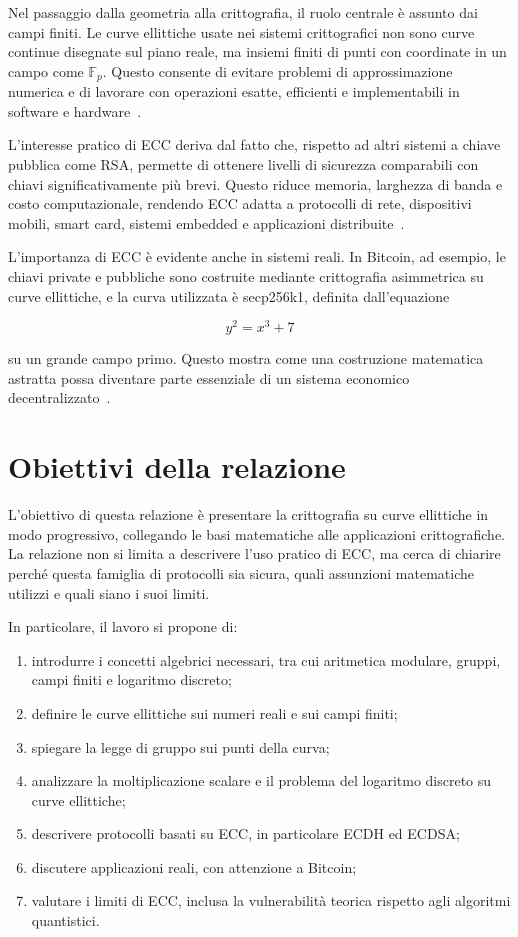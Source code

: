 \documentclass[12pt,a4paper,oneside]{report}
\begin{document}
Nel passaggio dalla geometria alla crittografia, il ruolo centrale è assunto dai campi finiti. Le curve ellittiche usate nei sistemi crittografici non sono curve continue disegnate sul piano reale, ma insiemi finiti di punti con coordinate in un campo come \(\mathbb{F}_p\). Questo consente di evitare problemi di approssimazione numerica e di lavorare con operazioni esatte, efficienti e implementabili in software e hardware~\cite{margara_ec,sec1}.

L'interesse pratico di ECC deriva dal fatto che, rispetto ad altri sistemi a chiave pubblica come RSA, permette di ottenere livelli di sicurezza comparabili con chiavi significativamente più brevi. Questo riduce memoria, larghezza di banda e costo computazionale, rendendo ECC adatta a protocolli di rete, dispositivi mobili, smart card, sistemi embedded e applicazioni distribuite~\cite{nist_sp800_57,sec1}.

L'importanza di ECC è evidente anche in sistemi reali. In Bitcoin, ad esempio, le chiavi private e pubbliche sono costruite mediante crittografia asimmetrica su curve ellittiche, e la curva utilizzata è secp256k1, definita dall'equazione

\begin{equation}
    y^2 = x^3 + 7
\end{equation}

su un grande campo primo. Questo mostra come una costruzione matematica astratta possa diventare parte essenziale di un sistema economico decentralizzato~\cite{margara_bitcoin,sec2}.

\section{Obiettivi della relazione}

L'obiettivo di questa relazione è presentare la crittografia su curve ellittiche in modo progressivo, collegando le basi matematiche alle applicazioni crittografiche. La relazione non si limita a descrivere l'uso pratico di ECC, ma cerca di chiarire perché questa famiglia di protocolli sia sicura, quali assunzioni matematiche utilizzi e quali siano i suoi limiti.

In particolare, il lavoro si propone di:

\begin{enumerate}
    \item introdurre i concetti algebrici necessari, tra cui aritmetica modulare, gruppi, campi finiti e logaritmo discreto;
    \item definire le curve ellittiche sui numeri reali e sui campi finiti;
    \item spiegare la legge di gruppo sui punti della curva;
    \item analizzare la moltiplicazione scalare e il problema del logaritmo discreto su curve ellittiche;
    \item descrivere protocolli basati su ECC, in particolare ECDH ed ECDSA;
    \item discutere applicazioni reali, con attenzione a Bitcoin;
    \item valutare i limiti di ECC, inclusa la vulnerabilità teorica rispetto agli algoritmi quantistici.
\end{enumerate}
\end{document}
